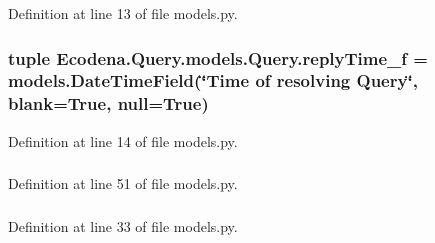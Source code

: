 Definition at line 13 of file models.py.

\hypertarget{class_ecodena_1_1_query_1_1models_1_1_query_a45776c99ebfd110c2d178c1223ddb886}{
\subsubsection[{replyTime\_\-f}]{\setlength{\rightskip}{0pt plus 5cm}tuple {\bf Ecodena.Query.models.Query.replyTime\_\-f} = models.DateTimeField(\char`\"{}Time of resolving {\bf Query}\char`\"{}, blank=True, null=True)}}
\label{de/d81/class_ecodena_1_1_query_1_1models_1_1_query_a45776c99ebfd110c2d178c1223ddb886}


Definition at line 14 of file models.py.

\hypertarget{class_ecodena_1_1_query_1_1models_1_1_query_a00674f59fb454935d65e31924d8a9df2}{
\subsubsection[{replyTime\_\-f}]{}}
\label{de/d81/class_ecodena_1_1_query_1_1models_1_1_query_a00674f59fb454935d65e31924d8a9df2}


Definition at line 51 of file models.py.

\hypertarget{class_ecodena_1_1_query_1_1models_1_1_query_a7d3a9e3880479a39865780b2c1180709}{
\subsubsection[{solution\_\-f}]{}}
\label{de/d81/class_ecodena_1_1_query_1_1models_1_1_query_a7d3a9e3880479a39865780b2c1180709}


Definition at line 33 of file models.py.

